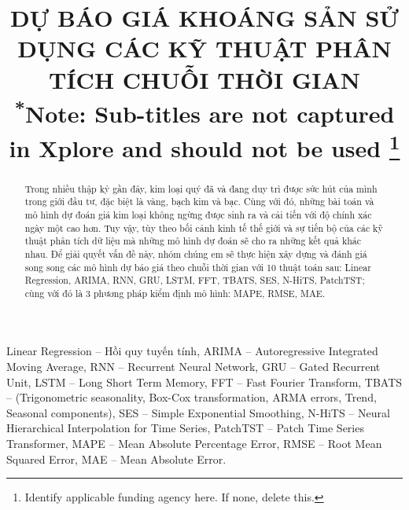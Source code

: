 \documentclass[conference]{IEEEtran}
\begin{document}
 

\title{DỰ BÁO GIÁ KHOÁNG SẢN SỬ DỤNG CÁC KỸ THUẬT PHÂN TÍCH CHUỖI THỜI GIAN \\
{\footnotesize \textsuperscript{*}Note: Sub-titles are not captured in Xplore and should not be used}
\thanks{Identify applicable funding agency here. If none, delete this.}
} 

\author{

}





\begin{abstract}
Trong nhiều thập kỷ gần đây, kim loại quý đã và đang duy trì được sức hút của mình trong giới đầu tư, đặc biệt là vàng, bạch kim và bạc. Cùng với đó, những bài toán và mô hình dự đoán giá kim loại không ngừng được sinh ra và cải tiến với độ chính xác ngày một cao hơn. Tuy vậy, tùy theo bối cảnh kinh tế thế giới và sự tiến bộ của các kỹ thuật phân tích dữ liệu mà những mô hình dự đoán sẽ cho ra những kết quả khác nhau. Để giải quyết vấn đề này, nhóm chúng em sẽ thực hiện xây dựng và đánh giá song song các mô hình dự báo giá theo chuỗi thời gian với 10 thuật toán sau: Linear Regression, ARIMA, RNN, GRU, LSTM, FFT, TBATS, SES, N-HiTS, PatchTST; cùng với đó là 3 phương pháp kiểm định mô hình: MAPE, RMSE, MAE.
\end{abstract} 

\begin{IEEEkeywords}
Linear Regression – Hồi quy tuyến tính, ARIMA – Autoregressive Integrated Moving Average, RNN – Recurrent Neural Network, GRU – Gated Recurrent Unit, LSTM – Long Short Term Memory, FFT – Fast Fourier Transform, TBATS – (Trigonometric seasonality, Box-Cox transformation, ARMA errors, Trend, Seasonal components), SES – Simple Exponential Smoothing, N-HiTS – Neural Hierarchical Interpolation for Time Series, PatchTST – Patch Time Series Transformer, MAPE – Mean Absolute Percentage Error, RMSE – Root Mean Squared Error, MAE – Mean Absolute Error.
\end{IEEEkeywords} 
\end{document}
